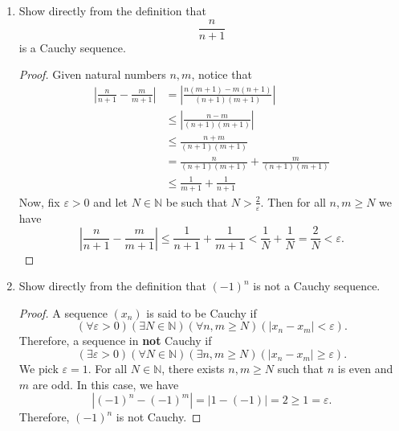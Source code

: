 \documentclass[12pt, reqno]{article}
\numberwithin{equation}{section}
\theoremstyle{definition}
\theoremstyle{remark}
\newcommand{\NN}{\mathbb{N}}
\newcommand{\abs}[1]{\left\lvert#1\right\rvert}
\renewcommand{\epsilon}{\varepsilon}
\begin{document}
\begin{enumerate}[leftmargin=*]
	\item Show directly from the definition that
	      \[
		      \frac{n}{n+1}
	      \]
	      is a Cauchy sequence.

	      \begin{proof}
		      Given natural numbers $n, m$, notice that
		      \begin{align*}
			      \abs{\frac{n}{n+1} - \frac{m}{m+1}}
			       & =\abs{\frac{n(m+1) - m(n+1)}{(n+1)(m+1)}}     \\
			       & \leq \abs{\frac{n-m}{(n+1)(m+1)}}             \\
			       & \leq \frac{n+m}{(n+1)(m+1)}                   \\
			       & = \frac{n}{(n+1)(m+1)} + \frac{m}{(n+1)(m+1)} \\
			       & \leq \frac{1}{m+1} +\frac{1}{n+1}
		      \end{align*}
		      Now, fix $\epsilon > 0$ and let $N\in\NN$ be such that $N > \frac{2}{\epsilon}$. Then for all $n,m \geq N$ we have
		      \[
			      \abs{\frac{n}{n+1} - \frac{m}{m+1}} \leq \frac{1}{n+1} +\frac{1}{m+1} < \frac{1}{N} + \frac{1}{N} = \frac{2}{N} < \epsilon.
		      \]
	      \end{proof}

	\item Show directly from the definition that $(-1)^n$ is not a Cauchy sequence.

	      \begin{proof}
		      A sequence $(x_n)$ is said to be Cauchy if
		      \[
			      (\forall \epsilon > 0)(\exists N\in \NN)(\forall n, m \geq N)(\abs{x_n - x_m} < \epsilon).
		      \]
		      Therefore, a sequence in \textbf{not} Cauchy if
		      \[
			      (\exists \epsilon > 0)(\forall N\in \NN)(\exists n, m \geq N)(\abs{x_n - x_m} \geq \epsilon).
		      \]
		      We pick $\epsilon = 1$. For all $N\in \NN$, there exists $n, m \geq N$ such that $n$ is even and $m$ are odd. In this case, we have
		      \[
			      \abs{(-1)^n - (-1)^m} = \abs{1 - (-1)} = 2 \geq 1 = \epsilon.
		      \]
		      Therefore, $(-1)^n$ is not Cauchy.
	      \end{proof}


\end{enumerate}
\end{document}
